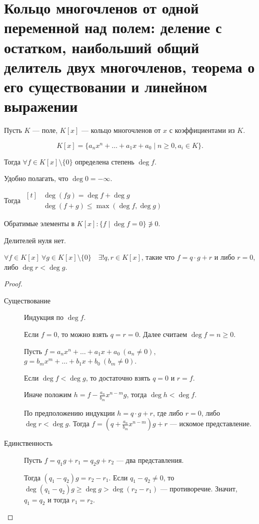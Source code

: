\section{Кольцо многочленов от одной переменной над полем: деление с остатком, наибольший общий делитель двух многочленов, теорема о его существовании и линейном выражении}

Пусть $K$ --- поле, $K[x]$ --- кольцо многочленов от $x$ с коэффициентами из $K$.

\begin{equation*}
    K[x] = \{a_n x^{n} + \dots + a_1 x + a_0 \mid n \geq 0, a_i \in K\}
.\end{equation*}

Тогда $\forall f \in K[x] \setminus \{0\}$ определена степень $\deg f$.

Удобно полагать, что $\deg 0 = -\infty$.

Тогда
\begin{math}
    \begin{align}[t]
        &\deg (fg) = \deg f + \deg g \\
        &\deg (f + g) \leq \max(\deg f, \deg g)
    \end{align}
\end{math}

\medskip
Обратимые элементы в $K[x]: \{f \mid \deg f = 0\} \not\ni 0$.

Делителей нуля нет.

\begin{theorem}
    $\forall f \in K[x] \ \forall g \in K[x] \setminus \{0\} \quad \exists! q, r \in K[x]$, такие что $f = q \cdot g + r$ и либо $r = 0$, либо $\deg r < \deg g$.
\end{theorem}

\begin{proof}~
    \begin{description}
    \item[Существование] 
        Индукция по $\deg f$.

        Если $f = 0$, то можно взять $q = r = 0$. Далее считаем $\deg f = n \geq 0$.

        Пусть $f = a_n x^{n} + \dots + a_1 x + a_0 \ (a_n \neq 0)$, $g = b_m x^{m} + \dots + b_1 x + b_0 \ (b_m \neq 0)$.

        Если $\deg f < \deg g$, то достаточно взять $q = 0$ и $r = f$.

        Иначе положим $h = f - \frac{a_n}{b_m}x^{n - m}g$, тогда $\deg h < \deg f$.

        По предположению индукции $h = q \cdot g + r$, где либо $r = 0$, либо $\deg r < \deg g$. Тогда $f = \left(q + \frac{a_n}{b_m} x^{n - m}\right) g + r$ --- искомое представление.

    \item[Единственность] Пусть $f = q_1 g + r_1 = q_2 g + r_2$ --- два представления.

        Тогда $(q_1 - q_2)g = r_2 - r_1$. Если $q_1 - q_2 \neq 0$, то $\deg (q_1 - q_2)g \geq \deg g > \deg (r_2 - r_1)$ --- противоречие. Значит, $q_1 = q_2$ и тогда $r_1 = r_2$.
        \qedhere
    \end{description}
\end{proof}


